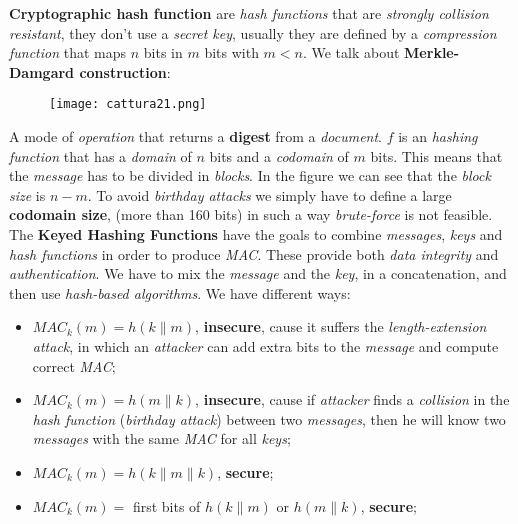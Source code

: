 \documentclass{article}
\begin{document}
\textbf{Cryptographic hash function} are \emph{hash functions} that are \emph{strongly collision resistant}, they don't use a \emph{secret key}, usually they are defined by a \emph{compression function} that maps $n$ bits in $m$ bits with $m<n$. We talk about \textbf{Merkle-Damgard construction}:
\begin{figure}[H]
  \centering
  \texttt{[image: cattura21.png]}
\end{figure}
A mode of \emph{operation} that returns a \textbf{digest} from a \emph{document}. $f$ is an \emph{hashing function} that has a \emph{domain} of $n$ bits and a \emph{codomain} of $m$ bits. This means that the \emph{message} has to be divided in \emph{blocks}. In the figure we can see that the \emph{block size} is $n-m$. To avoid \emph{birthday attacks} we simply have to define a large \textbf{codomain size}, (more than 160 bits) in such a way \emph{brute-force }is not feasible. \clearpage
\hfill \break
The \textbf{Keyed Hashing Functions} have the goals to combine \emph{messages}, \emph{keys} and \emph{hash functions} in order to produce \emph{MAC}. These provide both \emph{data integrity} and \emph{authentication}. We have to mix the \emph{message} and the \emph{key}, in a concatenation, and then use \emph{hash-based algorithms}. We have different ways:
\begin{itemize}
\item $MAC_k(m) = h(k\parallel m) $, \textbf{insecure}, cause it suffers the \emph{length-extension attack}, in which an \emph{attacker} can add extra bits to the \emph{message} and compute correct \emph{MAC};
\item $MAC_k(m) = h(m\parallel k) $, \textbf{insecure}, cause if \emph{attacker} finds a \emph{collision} in the \emph{hash function} (\emph{birthday attack}) between two \emph{messages}, then he will know two \emph{messages} with the same \emph{MAC} for all \emph{keys};
\item $MAC_k(m) = h(k\parallel m\parallel k)$, \textbf{secure};
\item $MAC_k(m) =$ first bits of $h(k\parallel m)$ or $h(m\parallel k)$, \textbf{secure};
\end{itemize}
\end{document}
